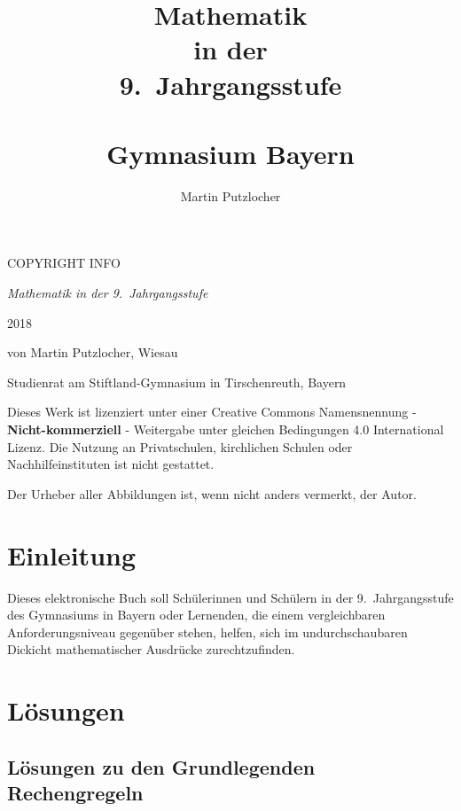 \documentclass[
a6paper, %
11pt, %
onecolumn, %
openany, %
]{memoir}
\author{Martin Putzlocher}
\title{Mathematik\\in der\\9.~Jahrgangsstufe\\~\\{\small Gymnasium Bayern}}
\theoremstyle{break}
\theoremstyle{break}
\theoremstyle{changebreak}
\theoremstyle{nonumberbreak}
\theoremstyle{nonumberplain}
\begin{document}
\frontmatter

\maketitle
\newpage
\null\vfill

\begin{flushleft}
\textcopyright COPYRIGHT INFO

\textit{Mathematik in der 9.~Jahrgangsstufe}

2018

von Martin Putzlocher, Wiesau

Studienrat am Stiftland-Gymnasium in Tirschenreuth, Bayern
\bigskip

\Large
\ccbyncsaeu
\normalsize
 
 
Dieses Werk ist lizenziert unter einer Creative Commons Namensnennung - \textbf{Nicht-kommerziell} - Weitergabe unter gleichen Bedingungen 4.0 International Lizenz.
Die Nutzung an Privatschulen, kirchlichen Schulen oder Nachhilfeinstituten ist nicht gestattet.

Der Urheber aller Abbildungen ist, wenn nicht anders vermerkt, der Autor.
\end{flushleft}
\clearpage



\tableofcontents*
\clearpage

\chapter{Einleitung}
Dieses elektronische Buch soll Schülerinnen und Schülern in der 9.~Jahrgangsstufe des Gymnasiums in Bayern oder Lernenden, die einem vergleichbaren Anforderungsniveau gegenüber stehen, helfen, sich im undurchschaubaren Dickicht mathematischer Ausdrücke zurechtzufinden.

\mainmatter




\backmatter

\chapter{Lösungen}
\section*{Lösungen zu den Grundlegenden Rechengregeln}
\label{sec:sol1}
\end{document}
